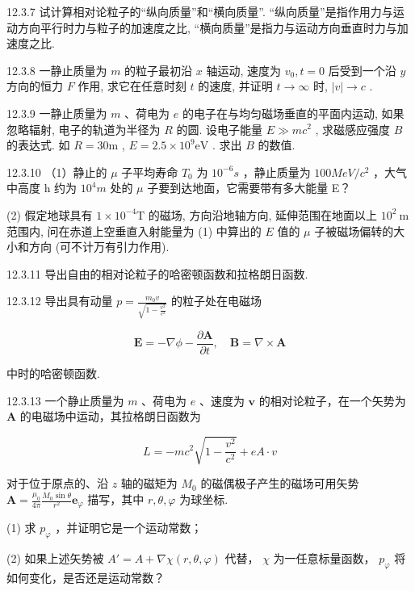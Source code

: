 \begin{problem}{12.3.7}
试计算相对论粒子的“纵向质量”和“横向质量”. “纵向质量”是指作用力与运动方向平行时力与粒子的加速度之比, “横向质量”是指力与运动方向垂直时力与加速度之比.
\end{problem}
\clearpage


\begin{problem}{12.3.8}
一静止质量为 $m$ 的粒子最初沿 $x$ 轴运动, 速度为 $v_0, t = 0$ 后受到一个沿 $y$ 方向的恒力 $F$ 作用, 求它在任意时刻 $t$ 的速度, 并证明 $t \to \infty$ 时, $|v| \to c$ .
\end{problem}
\clearpage


\begin{problem}{12.3.9}
一静止质量为 $m$ 、荷电为 $e$ 的电子在与均匀磁场垂直的平面内运动, 如果忽略辐射, 电子的轨道为半径为 $R$ 的圆. 设电子能量 $E \gg mc^2$ , 求磁感应强度 $B$ 的表达式. 如 $R = 30\mathrm{m}$ , $E = 2.5 \times 10^{9}\mathrm{eV}$ . 求出 $B$ 的数值.
\end{problem}
\clearpage


\begin{problem}{12.3.10}
（1）静止的 $\mu$ 子平均寿命 $T_{0}$ 为 $10^{-6}s$ ，静止质量为 $100MeV/c^{2}$ ，大气中高度 h 约为 $10^{4}m$ 处的 $\mu$ 子要到达地面，它需要带有多大能量 E？

(2) 假定地球具有 $1 \times 10^{-4} \mathrm{T}$ 的磁场, 方向沿地轴方向, 延伸范围在地面以上 $10^{2} \mathrm{~m}$ 范围内, 问在赤道上空垂直入射能量为 (1) 中算出的 $E$ 值的 $\mu$ 子被磁场偏转的大小和方向 (可不计万有引力作用).
\end{problem}
\clearpage


\begin{problem}{12.3.11}
导出自由的相对论粒子的哈密顿函数和拉格朗日函数.
\end{problem}
\clearpage


\begin{problem}{12.3.12}
导出具有动量 $p = \frac{m_0v}{\sqrt{1 - \frac{v^2}{c^2}}}$ 的粒子处在电磁场

\[
\bm {E} = - \nabla \phi - \frac {\partial \bm {A}}{\partial t}, \quad \bm {B} = \nabla \times \bm {A}
\]

中时的哈密顿函数.
\end{problem}
\clearpage


\begin{problem}{12.3.13}
一个静止质量为 $m$ 、荷电为 $e$ 、速度为 $\bm{v}$ 的相对论粒子，在一个矢势为 $\bm{A}$ 的电磁场中运动，其拉格朗日函数为

\[
L = - m c ^ {2} \sqrt {1 - \frac {v ^ {2}}{c ^ {2}}} + e A \cdot v
\]

对于位于原点的、沿 $z$ 轴的磁矩为 $M_0$ 的磁偶极子产生的磁场可用矢势 $\mathbf{A} = \frac{\mu_0}{4\pi}\frac{M_0\sin\theta}{r^2}\mathbf{e}_{\varphi}$ 描写，其中 $r, \theta, \varphi$ 为球坐标.

(1) 求 $p_{\varphi}$ ，并证明它是一个运动常数；

(2) 如果上述矢势被 $A' = A + \nabla \chi(r, \theta, \varphi)$ 代替， $\chi$ 为一任意标量函数， $p_{\varphi}$ 将如何变化，是否还是运动常数？
\end{problem}
\clearpage



